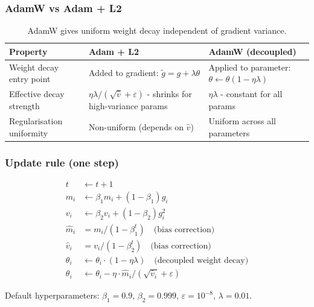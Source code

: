 \documentclass[12pt, a4paper]{article}
\begin{document}
\subsubsection{AdamW vs Adam + L2}

\begin{table}[!ht]
\centering
\renewcommand{\arraystretch}{1.3}
\begin{tabularx}{\textwidth}{@{} l L L @{}}
\toprule
\textbf{Property} & \textbf{Adam + L2} & \textbf{AdamW (decoupled)} \\
\midrule
Weight decay entry point & Added to gradient: \(\tilde{g} = g + \lambda\theta\) & Applied to parameter: \(\theta \leftarrow \theta(1 - \eta\lambda)\) \\
Effective decay strength & \(\eta\lambda / (\sqrt{\hat{v}} + \varepsilon)\) - shrinks for high-variance params & \(\eta\lambda\) - constant for all params \\
Regularisation uniformity & Non-uniform (depends on \(\hat{v}\)) & Uniform across all parameters \\
\bottomrule
\end{tabularx}
\caption{AdamW gives uniform weight decay independent of gradient variance.}
\end{table}

\subsubsection{Update rule (one step)}

\begin{align*}
  t                 &\leftarrow t + 1 \\
  m_i               &\leftarrow \beta_1 m_i + (1 - \beta_1) g_i \\
  v_i               &\leftarrow \beta_2 v_i + (1 - \beta_2) g_i^2 \\
  \hat{m}_i         &= m_i / (1 - \beta_1^t) \quad\text{(bias correction)} \\
  \hat{v}_i         &= v_i / (1 - \beta_2^t) \quad\text{(bias correction)} \\
  \theta_i          &\leftarrow \theta_i \cdot (1 - \eta\lambda)
                     \quad\text{(decoupled weight decay)} \\
  \theta_i          &\leftarrow \theta_i - \eta \cdot \hat{m}_i / (\sqrt{\hat{v}_i} + \varepsilon)
\end{align*}

Default hyperparameters:
\(\beta_1 = 0.9\), \(\beta_2 = 0.999\), \(\varepsilon = 10^{-8}\), \(\lambda = 0.01\).
\end{document}
